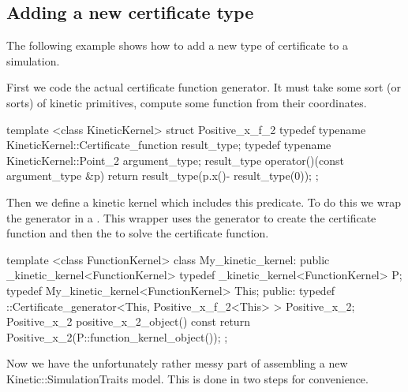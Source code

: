 \subsection{Adding a new certificate type}

The following example shows how to add a new type of certificate to a simulation. 

First we code the actual certificate function generator. It must take
some sort (or sorts) of kinetic primitives, compute some function from
their coordinates. 

\begin{ccExampleCode}
template <class KineticKernel>
struct Positive_x_f_2 {
  typedef typename KineticKernel::Certificate_function result_type;
  typedef typename KineticKernel::Point_2 argument_type;
  result_type operator()(const argument_type &p){
    return result_type(p.x()- result_type(0));
  }
};
\end{ccExampleCode}

Then we define a kinetic kernel which includes this predicate. To do
this we wrap the generator in a
. This wrapper uses the generator to create the certificate
function and then the  to solve the certificate
function.

\begin{ccExampleCode}
template <class FunctionKernel> 
class My_kinetic_kernel:
  public _kinetic_kernel<FunctionKernel> {
  typedef _kinetic_kernel<FunctionKernel> P;
  typedef My_kinetic_kernel<FunctionKernel> This;
public:
  typedef ::Certificate_generator<This, Positive_x_f_2<This> > Positive_x_2;
  Positive_x_2 positive_x_2_object() const
  {
    return Positive_x_2(P::function_kernel_object());
  }
};
\end{ccExampleCode}

Now we have the unfortunately rather messy part of assembling a new
Kinetic::SimulationTraits model. This is done in two steps for convenience.

